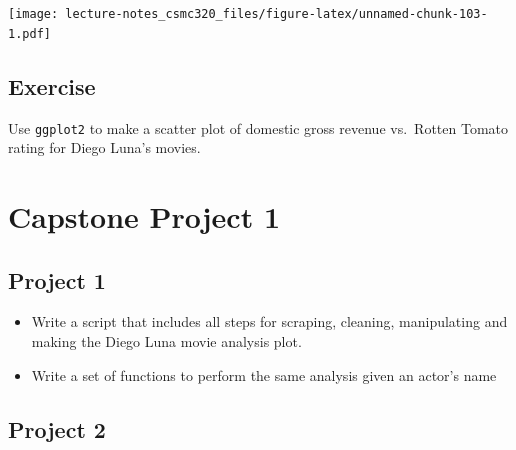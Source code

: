 \documentclass[12pt,]{book}
\newenvironment{Shaded}{\begin{snugshade}}{\end{snugshade}}
\newcommand{\KeywordTok}[1]{\textcolor[rgb]{0.13,0.29,0.53}{\textbf{#1}}}
\newcommand{\DataTypeTok}[1]{\textcolor[rgb]{0.13,0.29,0.53}{#1}}
\newcommand{\StringTok}[1]{\textcolor[rgb]{0.31,0.60,0.02}{#1}}
\newcommand{\OperatorTok}[1]{\textcolor[rgb]{0.81,0.36,0.00}{\textbf{#1}}}
\newcommand{\NormalTok}[1]{#1}
\theoremstyle{definition}
\theoremstyle{definition}
\theoremstyle{definition}
\theoremstyle{remark}
\begin{document}
\begin{Shaded}
\end{Shaded}

\texttt{[image: lecture-notes\_csmc320\_files/figure-latex/unnamed-chunk-103-1.pdf]}

\section{Exercise}\label{exercise-1}

Use \texttt{ggplot2} to make a scatter plot of domestic gross revenue
vs.~Rotten Tomato rating for Diego Luna's movies.

\chapter{Capstone Project 1}\label{capstone-project-1}

\section{Project 1}\label{project-1}

\begin{itemize}
\item
  Write a script that includes all steps for scraping, cleaning,
  manipulating and making the Diego Luna movie analysis plot.
\item
  Write a set of functions to perform the same analysis given an actor's
  name
\end{itemize}

\section{Project 2}\label{project-2}
\end{document}
